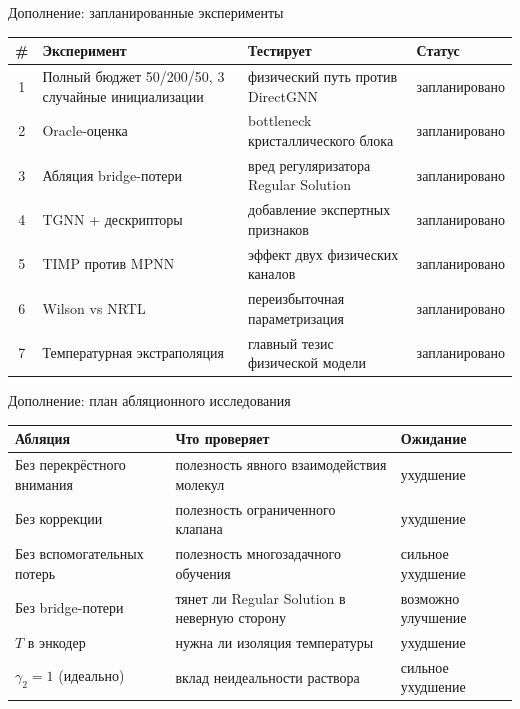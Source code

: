 \documentclass[aspectratio=169,10pt]{beamer}
\begin{document}
\begin{frame}{Дополнение: запланированные эксперименты}
  \scriptsize
  \begin{tabularx}{\textwidth}{clYY}
    \toprule
    \# & \textbf{Эксперимент} & \textbf{Тестирует} & \textbf{Статус}\\
     & Полный бюджет 50/200/50, 3 случайные инициализации & физический путь против DirectGNN & запланировано\\
    2 & Oracle-оценка & bottleneck кристаллического блока & запланировано\\
    3 & Абляция bridge-потери & вред регуляризатора Regular Solution & запланировано\\
    4 & TGNN + дескрипторы & добавление экспертных признаков & запланировано\\
    5 & TIMP против MPNN & эффект двух физических каналов & запланировано\\
    6 & Wilson vs NRTL & переизбыточная параметризация & запланировано\\
    7 & Температурная экстраполяция & главный тезис физической модели & запланировано\\
    \bottomrule
  \end{tabularx}
\end{frame}

\begin{frame}{Дополнение: план абляционного исследования}
  \scriptsize
  \begin{tabularx}{\textwidth}{lYY}
    \toprule
    \textbf{Абляция} & \textbf{Что проверяет} & \textbf{Ожидание}\\
    \midrule
    Без перекрёстного внимания & полезность явного взаимодействия молекул & ухудшение\\
    Без коррекции & полезность ограниченного клапана & ухудшение\\
    Без вспомогательных потерь & полезность многозадачного обучения & сильное ухудшение\\
    Без bridge-потери & тянет ли Regular Solution в неверную сторону & возможно улучшение\\
    $T$ в энкодер & нужна ли изоляция температуры & ухудшение\\
    $\gamma_2=1$ (идеально) & вклад неидеальности раствора & сильное ухудшение\\
    \bottomrule
  \end{tabularx}
\end{frame}
\end{document}
